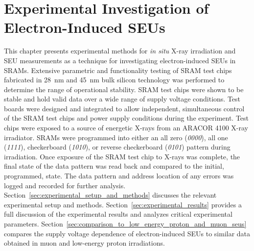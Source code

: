 
\chapter{Experimental Investigation of Electron-Induced SEUs} %
\label{cha:experimental_investigation_of_electron_induced_seus}
This chapter presents experimental methods for \emph{in situ} X-ray irradiation and SEU measurements as a technique for investigating electron-induced SEUs in SRAMs. 
Extensive parametric and functionality testing of SRAM test chips fabricated in 28~nm and 45~nm bulk silicon technology was performed to determine the range of operational stability.
SRAM test chips were shown to be stable and hold valid data over a wide range of supply voltage conditions.
Test boards were designed and integrated to allow independent, simultaneous control of the SRAM test chips and power supply conditions during the experiment.
Test chips were exposed to a source of energetic X-rays from an ARACOR 4100 X-ray irradiator.
SRAMs were programmed into either an all zero (\emph{0000}), all one (\emph{1111}), checkerboard (\emph{1010}), or reverse checkerboard (\emph{0101}) pattern during irradiation.
Once exposure of the SRAM test chip to X-rays was complete, the final state of the data pattern was read back and compared to the initial, programmed, state.
The data pattern and address location of any errors was logged and recorded for further analysis.
Section~\ref{sec:experimental_setup_and_methods} discusses the relevant experimental setup and methods.
Section~\ref{sec:experimental_results} provides a full discussion of the experimental results and analyzes critical experimental parameters.
Section~\ref{sec:comparison_to_low_energy_proton_and_muon_seus} compares the supply voltage dependence of electron-induced SEUs to similar data obtained in muon and low-energy proton irradiations.
 
